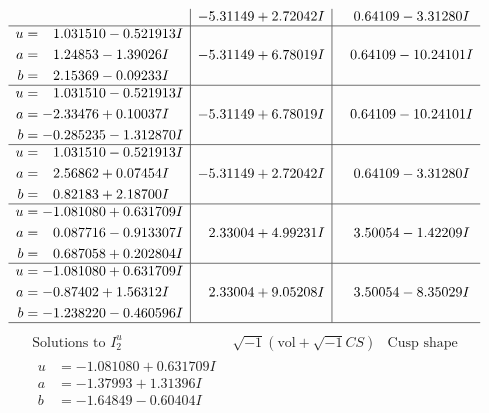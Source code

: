 \documentclass[1p]{elsarticle_modified}
\theoremstyle{definition}
\newcommand{\I}{\sqrt{-1}}
\begin{document}
$$\begin{array}{c|c|c}
 & -5.31149 + 2.72042 I & \phantom{-}0.64109 - 3.31280 I \\ \hline\begin{aligned}
u &= \phantom{-}1.031510 - 0.521913 I \\
a &= \phantom{-}1.24853 - 1.39026 I \\
b &= \phantom{-}2.15369 - 0.09233 I\end{aligned}
 & -5.31149 + 6.78019 I & \phantom{-}0.64109 - 10.24101 I \\ \hline\begin{aligned}
u &= \phantom{-}1.031510 - 0.521913 I \\
a &= -2.33476 + 0.10037 I \\
b &= -0.285235 - 1.312870 I\end{aligned}
 & -5.31149 + 6.78019 I & \phantom{-}0.64109 - 10.24101 I \\ \hline\begin{aligned}
u &= \phantom{-}1.031510 - 0.521913 I \\
a &= \phantom{-}2.56862 + 0.07454 I \\
b &= \phantom{-}0.82183 + 2.18700 I\end{aligned}
 & -5.31149 + 2.72042 I & \phantom{-}0.64109 - 3.31280 I \\ \hline\begin{aligned}
u &= -1.081080 + 0.631709 I \\
a &= \phantom{-}0.087716 - 0.913307 I \\
b &= \phantom{-}0.687058 + 0.202804 I\end{aligned}
 & \phantom{-}2.33004 + 4.99231 I & \phantom{-}3.50054 - 1.42209 I \\ \hline\begin{aligned}
u &= -1.081080 + 0.631709 I \\
a &= -0.87402 + 1.56312 I \\
b &= -1.238220 - 0.460596 I\end{aligned}
 & \phantom{-}2.33004 + 9.05208 I & \phantom{-}3.50054 - 8.35029 I\\
 \hline 
 \end{array}$$\newpage$$\begin{array}{c|c|c}  
\text{Solutions to }I^u_{2}& \I (\text{vol} + \sqrt{-1}CS) & \text{Cusp shape}\\
 \hline 
\begin{aligned}
u &= -1.081080 + 0.631709 I \\
a &= -1.37993 + 1.31396 I \\
b &= -1.64849 - 0.60404 I\end{aligned}

\end{array}$$
\end{document}
